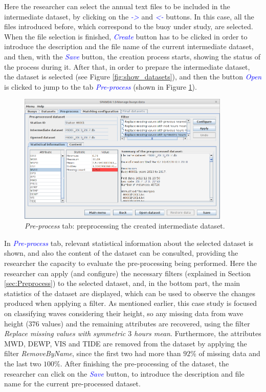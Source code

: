 \documentclass[review]{elsarticle}
\begin{document}
			Here the researcher can select the annual text files to be included in the intermediate dataset, by clicking on the \textcolor{blue}{\textit{->}} and \textcolor{blue}{\textit{<-}} buttons. In this case, all the files introduced before, which correspond to the buoy under study, are selected. When the file selection is finished, \textcolor{blue}{\textit{Create}} button has to be clicked in order to introduce the description and the file name of the current intermediate dataset, and then, with the \textcolor{blue}{\textit{Save}} button, the creation process starts, showing the status of the process during it. After that, in order to prepare the intermediate dataset, the dataset is selected (see Figure \ref{fig:show_datasets}), and then the button \textcolor{blue}{\textit{Open}} is clicked to jump to the tab \textcolor{blue}{\textit{Pre-process}} (shown in Figure \ref{fig:preprocess_data}).
			
			\begin{figure}[ht!]
				\centering
				\includegraphics[width=0.90\textwidth]{figures/FigurePreprocess.png}
				\caption{\textit{Pre-process} tab: preprocessing the created intermediate dataset.}\label{fig:preprocess_data}
			\end{figure}

			
			In \textcolor{blue}{\textit{Pre-process}} tab, relevant statistical information about the selected dataset is shown, and also the content of the dataset can be consulted, providing the researcher the capacity to evaluate the pre-processing being performed. Here the researcher can apply (and configure) the necessary filters (explained in Section \ref{sec:Preprocess}) to the selected dataset, and, in the bottom part, the main statistics of the dataset are displayed, which can be used to observe the changes produced when applying a filter. As mentioned earlier, this case study is focused on classifying waves considering their height, so any missing data from wave height ($376$ values) and the remaining attributes are recovered, using the filter \textit{Replace missing values with symmetric $3$ hours mean}. Furthermore, the attributes MWD, DEWP, VIS and TIDE are removed from the dataset by applying the filter \textit{RemoveByName}, since the first two had more than $92$\% of missing data and the last two $100$\%. After finishing the pre-processing of the dataset, the researcher can click on the \textcolor{blue}{\textit{Save}} button, to introduce the description and file name for the current pre-processed dataset.
			
\end{document}
